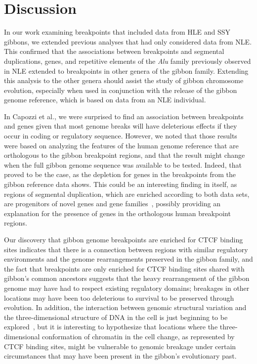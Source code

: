 \section{Discussion}

In our work examining breakpoints that included data from HLE and SSY gibbons, we extended previous analyses that had only considered data from NLE. This confirmed that the associations between breakpoints and segmental duplications, genes, and repetitive elements of the \emph{Alu} family previously observed in NLE extended to breakpoints in other genera of the gibbon family. Extending this analysis to the other genera should assist the study of gibbon chromosome evolution, especially when used in conjunction with the release of the gibbon genome reference, which is based on data from an NLE individual.

In Capozzi et al.\cite{Capozzi:2012bb}, we were surprised to find an association between breakpoints and genes given that most genome breaks will have deleterious effects if they occur in coding or regulatory sequence. However, we noted that those results were based on analyzing the features of the human genome reference that are orthologous to the gibbon breakpoint regions, and that the result might change when the full gibbon genome sequence was available to be tested. Indeed, that proved to be the case, as the depletion for genes in the breakpoints from the gibbon reference data shows. This could be an interesting finding in itself, as regions of segmental duplication, which are enriched according to both data sets, are progenitors of novel genes and gene families~\cite{Bailey:2006fn}, possibly providing an explanation for the presence of genes in the orthologous human breakpoint regions.

Our discovery that gibbon genome breakpoints are enriched for CTCF binding sites indicates that there is a connection between regions with similar regulatory environments and the genome rearrangements preserved in the gibbon family, and the fact that breakpoints are only enriched for CTCF binding sites shared with gibbon's common ancestors suggests that the heavy rearrangement of the gibbon genome may have had to respect existing regulatory domains; breakages in other locations may have been too deleterious to survival to be preserved through evolution. In addition, the interaction between genomic structural variation and the three-dimensional structure of DNA in the cell is just beginning to be explored~\cite{Dixon:2012gc}, but it is interesting to hypothesize that locations where the three-dimensional conformation of chromatin in the cell change, as represented by CTCF binding sites, might be vulnerable to genomic breakage under certain circumstances that may have been present in the gibbon's evolutionary past.